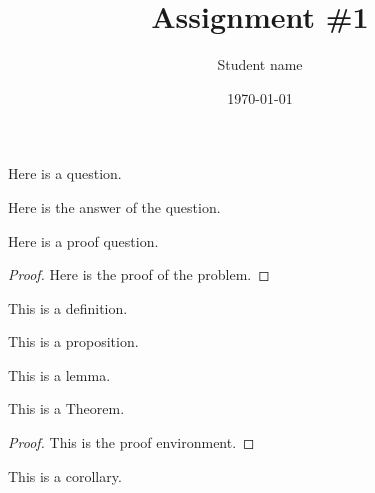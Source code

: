 \documentclass[12pt,en]{homework}
\title{Assignment \#1} %
\author{Student name} %
\date{\today} %
\institute{Institute or school name} %
\begin{document}
\maketitle




\begin{problem}
Here is a question.
\end{problem}

\begin{solution}
Here is the answer of the question.
\end{solution}


\begin{problem}
Here is a proof question.
\end{problem}

\begin{proof}
Here is the proof of the problem.
\end{proof}


\vspace{3em}

\begin{definition}\label{def:foo}
This is a definition.
\end{definition}

\begin{proposition}\label{prop:foo}
This is a proposition.
\end{proposition}

\begin{lemma}[Lemma]\label{lmm:foo}
This is a lemma.
\end{lemma}

\begin{theorem}[Theorem]\label{thm:foo}
This is a Theorem.
\end{theorem}
\begin{proof}
This is the proof environment.
\end{proof}

\begin{corollary}\label{cor:foo}
This is a corollary.
\end{corollary}
\end{document}

